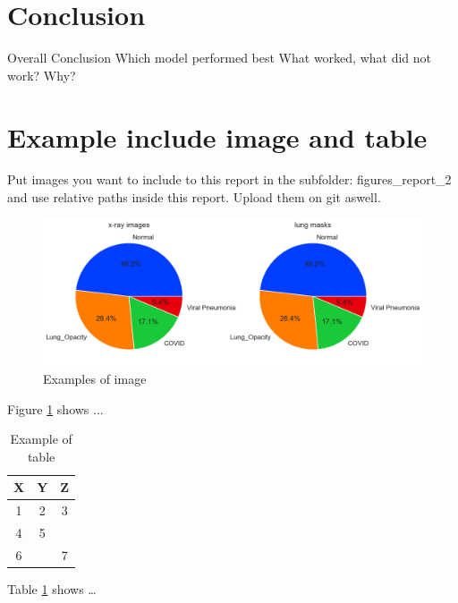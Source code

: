 \documentclass{article}
\begin{document}
\section{Conclusion}
Overall Conclusion
Which model performed best
What worked, what did not work? Why?

\section{Example include image and table}

Put images you want to include to this report in the subfolder: figures\_report\_2 and use relative paths inside this report.
Upload them on git aswell.

\begin{figure}[h!] %
    \centering
    \includegraphics[width=1.0\linewidth]{../figures/figures_report_2/classes.png}
    \caption{Examples of image}
    \label{fig:example_image}
\end{figure}

Figure \ref{fig:example_image} shows ...


\begin{table}[h]
    \centering
    \begin{tabular}{|c|c|c|}
        \hline
        \textbf{X} & \textbf{Y} & \textbf{Z} \\ \hline
        1 & 2 & 3 \\ \hline
        4 & 5 &  \\ \hline \hline
        6 &  & 7 \\ \hline
    \end{tabular}
    \caption{Example of table}
    \label{tab:example_table}
\end{table}

Table \ref{tab:example_table} shows \dots
\end{document}
